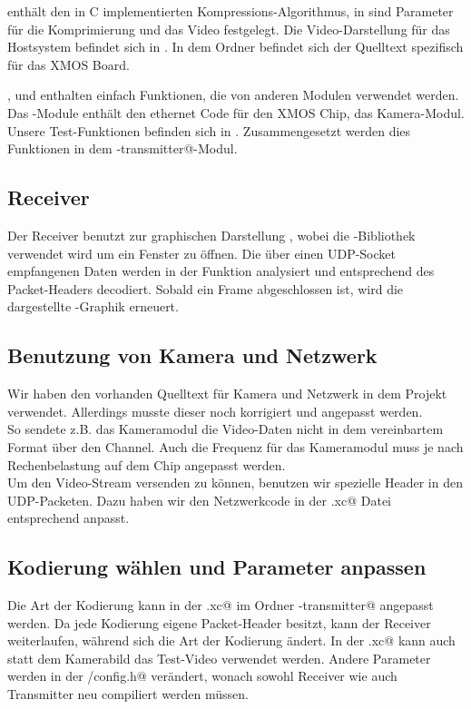 \verb@codec@ enthält den in C implementierten Kompressions-Algorithmus,
in \verb@videfs@ sind Parameter für die Komprimierung und das Video festgelegt.
Die Video-Darstellung für das Hostsystem befindet sich in \verb@receiver@.
In dem \verb@board@ Ordner befindet sich der Quelltext spezifisch für das XMOS Board.

\verb@common@, \verb@chksum@ und \verb@compat@ enthalten einfach Funktionen,
die von anderen Modulen verwendet werden. 
Das \verb@net@-Module enthält den ethernet Code für den XMOS Chip,
\verb@cam@ das Kamera-Modul.
Unsere Test-Funktionen befinden sich in \verb@test@. Zusammengesetzt
werden dies Funktionen in dem \verb@stream-transmitter@-Modul.

\subsection{Receiver}
Der Receiver benutzt zur graphischen Darstellung \verb@gl@, 
wobei die \verb@glut@-Bibliothek verwendet wird um ein Fenster zu öffnen.
Die über einen UDP-Socket empfangenen Daten werden in der \lstinline@receiver@
Funktion analysiert und entsprechend des Packet-Headers decodiert. 
Sobald ein Frame abgeschlossen ist, wird die dargestellte \verb@gl@-Graphik 
erneuert.

\subsection{Benutzung von Kamera und Netzwerk}
Wir haben den vorhanden Quelltext für Kamera und Netzwerk in dem Projekt
verwendet. Allerdings musste dieser noch korrigiert und angepasst werden.
\\So sendete z.B. das Kameramodul die Video-Daten nicht in dem vereinbartem Format
über den Channel. Auch die Frequenz für das Kameramodul muss je nach
Rechenbelastung auf dem Chip angepasst werden.
\\
Um den Video-Stream versenden zu können, benutzen wir spezielle Header in den
UDP-Packeten. Dazu haben wir den Netzwerkcode in der \verb@udb.xc@ Datei
entsprechend anpasst.

\subsection{Kodierung wählen und Parameter anpassen}

Die Art der Kodierung kann in der \verb@main.xc@ im Ordner
\verb@board\streaming-transmitter@ angepasst werden. Da jede Kodierung
eigene Packet-Header besitzt, kann der Receiver weiterlaufen, während sich
die Art der Kodierung ändert.
In der \verb@main.xc@ kann auch statt dem Kamerabild das Test-Video verwendet
werden.
Andere Parameter werden in der \verb@videfs/config.h@ verändert, 
wonach sowohl Receiver wie auch Transmitter neu compiliert werden müssen.



